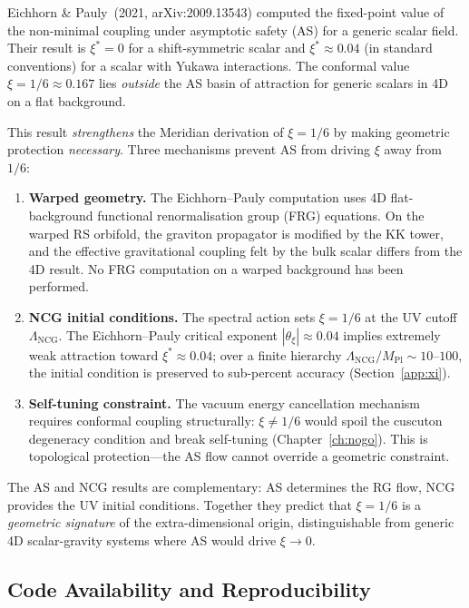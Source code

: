 Eichhorn \& Pauly~(2021, arXiv:2009.13543) computed the fixed-point value of the non-minimal coupling under asymptotic safety (AS) for a generic scalar field. Their result is $\xi^* = 0$ for a shift-symmetric scalar and $\xi^* \approx 0.04$ (in standard conventions) for a scalar with Yukawa interactions. The conformal value $\xi = 1/6 \approx 0.167$ lies \emph{outside} the AS basin of attraction for generic scalars in 4D on a flat background.

This result \emph{strengthens} the Meridian derivation of $\xi = 1/6$ by making geometric protection \emph{necessary}. Three mechanisms prevent AS from driving $\xi$ away from $1/6$:
\begin{enumerate}
  \item \textbf{Warped geometry.} The Eichhorn--Pauly computation uses 4D flat-background functional renormalisation group (FRG) equations. On the warped RS orbifold, the graviton propagator is modified by the KK tower, and the effective gravitational coupling felt by the bulk scalar differs from the 4D result. No FRG computation on a warped background has been performed.
  \item \textbf{NCG initial conditions.} The spectral action sets $\xi = 1/6$ at the UV cutoff $\Lambda_\mathrm{NCG}$. The Eichhorn--Pauly critical exponent $|\theta_\xi| \approx 0.04$ implies extremely weak attraction toward $\xi^* \approx 0.04$; over a finite hierarchy $\Lambda_\mathrm{NCG}/M_\mathrm{Pl} \sim 10$--$100$, the initial condition is preserved to sub-percent accuracy (Section~\ref{app:xi}).
  \item \textbf{Self-tuning constraint.} The vacuum energy cancellation mechanism requires conformal coupling structurally: $\xi \neq 1/6$ would spoil the cuscuton degeneracy condition and break self-tuning (Chapter~\ref{ch:nogo}). This is topological protection---the AS flow cannot override a geometric constraint.
\end{enumerate}
The AS and NCG results are complementary: AS determines the RG flow, NCG provides the UV initial conditions. Together they predict that $\xi = 1/6$ is a \emph{geometric signature} of the extra-dimensional origin, distinguishable from generic 4D scalar-gravity systems where AS would drive $\xi \to 0$.

\subsection{Code Availability and Reproducibility}
\label{app:code}

